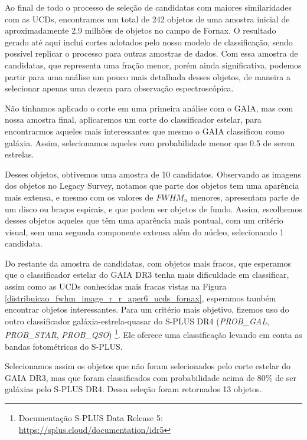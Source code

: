 Ao final de todo o processo de seleção de candidatas com maiores similaridades com as UCDs, encontramos um total de 242 objetos de uma amostra inicial de aproximadamente 2,9 milhões de objetos no campo de Fornax. O resultado gerado até aqui inclui cortes adotados pelo nosso modelo de classificação, sendo possível replicar o processo para outras amostras de dados. Com essa amostra de candidatas, que representa uma fração menor, porém ainda significativa, podemos partir para uma análise um pouco mais detalhada desses objetos, de maneira a selecionar apenas uma dezena para observação espectroscópica.

Não tínhamos aplicado o corte em uma primeira análise com o GAIA, mas com nossa amostra final, aplicaremos um corte do classificador estelar, para encontrarmos aqueles mais interessantes que mesmo o GAIA classificou como galáxia. Assim, selecionamos aqueles com probabilidade menor que 0.5 de serem estrelas.

Desses objetos, obtivemos uma amostra de 10 candidatos. Observando as imagens dos objetos no Legacy Survey, notamos que parte dos objetos tem uma aparência mais extensa, e mesmo com os valores de $\textit{FWHM}_n$ menores, apresentam parte de um disco ou braços espirais, e que podem ser objetos de fundo. Assim, escolhemos desses objetos aqueles que têm uma aparência mais pontual, com um critério visual, sem uma segunda componente extensa além do núcleo, selecionando 1 candidata. 


Do restante da amostra de candidatas, com objetos mais fracos, que esperamos que o classificador estelar do GAIA DR3 tenha mais dificuldade em classificar, assim como as UCDs conhecidas mais fracas vistas na Figura \ref{distribuicao_fwhm_image_r_r_aper6_ucds_fornax}, esperamos também encontrar objetos interessantes. Para um critério mais objetivo, fizemos uso do outro classificador galáxia-estrela-quasar do S-PLUS DR4 (\textit{PROB\_GAL}, \textit{PROB\_STAR}, \textit{PROB\_QSO}) \citep{lili_classification}\footnote{Documentação S-PLUS Data Release 5: \url{https://splus.cloud/documentation/idr5}}. Ele oferece uma classificação levando em conta as bandas fotométricas do S-PLUS.

Selecionamos assim os objetos que não foram selecionados pelo corte estelar do GAIA DR3, mas que foram classificados com probabilidade acima de 80\% de ser galáxias pelo S-PLUS DR4. Dessa seleção foram retornados 13 objetos.

